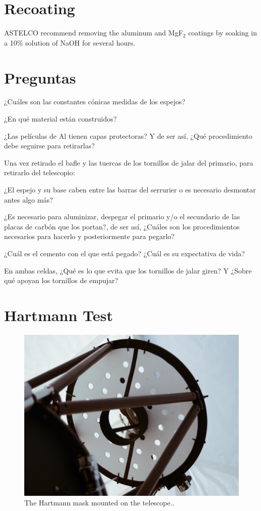 \section{Recoating}

ASTELCO recommend removing the aluminum and MgF$_2$ coatings by soaking in a 10\% solution of NaOH for several hours.


\section{Preguntas}

¿Cuáles son las constantes cónicas medidas de los espejos?

¿En qué material están construidos?

¿Las películas de Al tienen capas protectoras? Y de ser así, ¿Qué procedimiento debe seguirse para retirarlas?

Una vez retirado el bafle y las tuercas de los tornillos de jalar del primario, para retirarlo del telescopio:

¿El espejo y su base caben entre las barras del serrurier o es necesario desmontar antes algo más?

 ¿Es necesario para aluminizar, despegar el primario y/o el secundario de las placas de carbón que los portan?, de ser así, ¿Cuáles son los procedimientos necesarios para hacerlo y posteriormente para pegarlo?

¿Cuál es el cemento con el que está pegado? ¿Cuál es su expectativa de vida?

En ambas celdas, ¿Qué es lo que evita que los tornillos de jalar giren? Y ¿Sobre qué apoyan los tornillos de empujar?

\section{Hartmann Test}

\begin{figure}
\begin{center}
\includegraphics[width=1.0\linewidth]{figures/telescope-hartmann-mask-mounted.jpg}
\end{center}
\caption{The Hartmann mask mounted on the telescope..}
\label{figure:telescope-hartmann-mask-mounted}
\end{figure}

